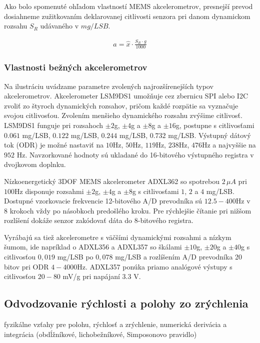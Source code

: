 Ako bolo spomenuté ohľadom vlastností MEMS akcelerometrov, presnejší prevod dosiahneme zužitkovaním deklarovanej citlivosti senzora pri danom dynamickom rozsahu $S_R$ udávaného v $mg/LSB$.
\begin{ceqn}\begin{align}
   a = \hat{x} \cdot \frac{S_R \cdot g}{1000}
\end{align}\end{ceqn}

\subsubsection{Vlastnosti bežných akcelerometrov}
Na ilustráciu uvádzame parametre zvolených najrozšírenejších typov akcelerometrov. Akcelerometer LSM9DS1 \cite{lsm9ds1} umožňuje cez 
zbernicu SPI alebo I2C zvoliť zo štyroch dynamických rozsahov, pričom každé rozpätie sa vyznačuje svojou citlivosťou. Zvolením menšieho 
dynamického rozsahu zvýšime citlivosť. LSM9DS1 funguje pri rozsahoch $\pm2$g, $\pm4$g a $\pm8$g a $\pm16$g, postupne s citlivosťami 
$0.061$ mg/LSB, $0.122$ mg/LSB, $0.244$ mg/LSB, $0.732$ mg/LSB. Výstupný dátový tok (ODR) je možné nastaviť na $10$Hz, $50$Hz, 
$119$Hz, $238$Hz, $476$Hz a najvyššie na $952$ Hz. Navzorkované hodnoty sú ukladané do 16-bitového výstupného registra v 
dvojkovom doplnku. 

Nízkoenergetický 3DOF MEMS akcelerometer ADXL362 \cite{adxl362} so spotrebou $2\,\mu A$ pri $100$Hz disponuje
rozsahmi $\pm2$g, $\pm4$g a $\pm8$g s citlivosťami $1$, $2$ a $4$ mg/LSB. Dostupné vzorkovacie frekvencie 12-bitového A/D prevodníka sú $12.5 - 400$Hz v 8 krokoch vždy po násobkoch predošlého kroku. Pre rýchlejšie čítanie pri nižšom rozlíšení dokáže senzor zakódovať dáta do 8-bitového registra.

Vyrábajú sa tiež akcelerometre s väčšími dynamickými rozsahmi a nízkym šumom, ide napríklad o ADXL356 a ADXL357 \cite{adxl357} so škálami $\pm 10$g, $\pm 20$g a $\pm 40$g s citlivosťou $0,019$ mg/LSB po $0,078$ mg/LSB a rozlíšením A/D prevodníka 20 bitov pri ODR $4 - 4000$Hz. ADXL357 ponúka priamo analógové výstupy s citlivosťou $20 - 80$ mV/g pri napájaní $3.3$ V.

\subsection{Odvodzovanie rýchlosti a polohy zo zrýchlenia}
fyzikálne vzťahy pre polohu, rýchlosť a zrýchlenie, numerická derivácia a integrácia (obdĺžníkové, lichobežníkové, Simposonovo pravidlo) \cite{integration-acceleration-envelopes}

